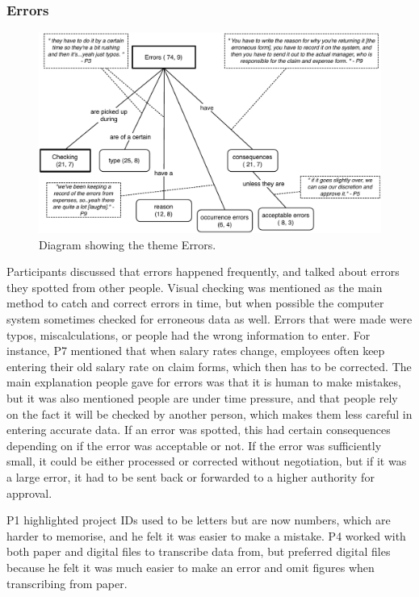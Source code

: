 \documentclass[11pt,oneside]{report}
\begin{document}
\subsubsection{Errors}
\begin{figure}[!ht]
\centering
\includegraphics[width=\textwidth]{images/Study1/Errors.pdf}
\caption{Diagram showing the theme Errors.}
\vspace{-9pt}
\label{fig:ch3_errors}
\end{figure}

Participants discussed that errors happened frequently, and talked about errors they spotted from other people. Visual checking was mentioned as the main method to catch and correct errors in time, but when possible the computer system sometimes checked for erroneous data as well. Errors that were made were typos, miscalculations, or people had the wrong information to enter. For instance, P7 mentioned that when salary rates change, employees often keep entering their old salary rate on claim forms, which then has to be corrected. The main explanation people gave for errors was that it is human to make mistakes, but it was also mentioned people are under time pressure, and that people rely on the fact it will be checked by another person, which makes them less careful in entering accurate data. 
If an error was spotted, this had certain consequences depending on if the error was acceptable or not. If the error was sufficiently small, it could be either processed or corrected without negotiation, but if it was a large error, it had to be sent back or forwarded to a higher authority for approval. 

P1 highlighted project IDs used to be letters but are now numbers, which are harder to memorise, and he felt it was easier to make a mistake. P4 worked with both paper and digital files to transcribe data from, but preferred digital files because he felt it was much easier to make an error and omit figures when transcribing from paper.
\end{document}
